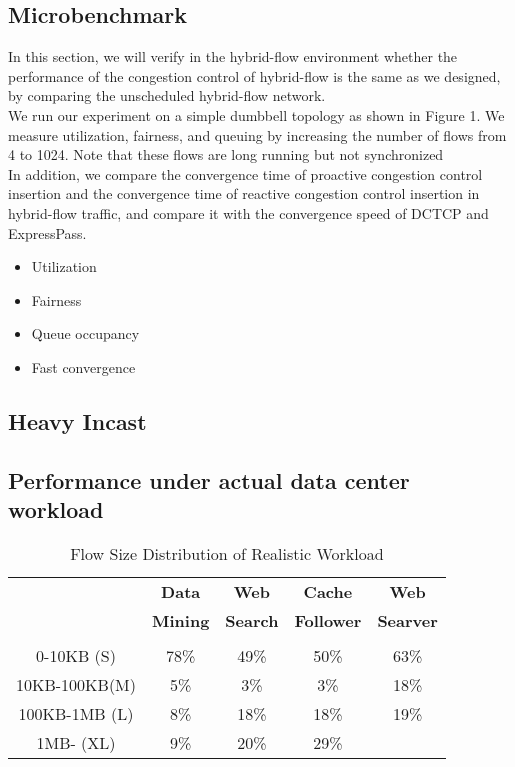 \documentclass[conference]{IEEEtran}
\begin{document}
\subsection{Microbenchmark}
In this section, we will verify in the hybrid-flow environment whether the performance of the congestion control of hybrid-flow is the same as we designed, by comparing the unscheduled hybrid-flow network.\\
\indent We run our experiment on a simple dumbbell topology as shown in Figure 1. We measure utilization, fairness, and queuing by increasing the number of flows from 4 to 1024. Note that these flows are long running but not synchronized\\
In addition, we compare the convergence time of proactive congestion control insertion and the convergence time of reactive congestion control insertion in hybrid-flow traffic, and compare it with the convergence speed of DCTCP and ExpressPass.
\begin{itemize}
\item  Utilization
\item Fairness
\item Queue occupancy
\item Fast convergence
\end{itemize}
\subsection{Heavy Incast}
\subsection{Performance under actual data center workload}
\begin{table}[!t]
\renewcommand{\arraystretch}{1.3}
\caption{Flow Size Distribution of Realistic Workload}
\label{table_example}
\centering
\begin{tabular}{c||c|c|c|c}
\hline
\bfseries  & \bfseries Data  & \bfseries Web  & \bfseries Cache  & \bfseries Web \\
\bfseries  & \bfseries Mining  & \bfseries Search  & \bfseries Follower  & \bfseries Searver \\
\bfseries  & \bfseries \cite{GREENBERG2009VL2} & \bfseries \cite{Alizadeh2010Data} & \bfseries  \cite{roy2015inside} & \bfseries \cite{roy2015inside}\\
\hline\hline
0-10KB    (S) & 78\% & 49\% & 50\% &63\%\\
\hline
10KB-100KB(M) &  5\% & 3\%  & 3\% & 18\%\\
\hline
100KB-1MB (L) & 8\% & 18\% & 18\% & 19\%\\
\hline
1MB-      (XL)& 9\% & 20\% & 29\% &   \\
\hline
\end{tabular}
\end{table}
\end{document}
